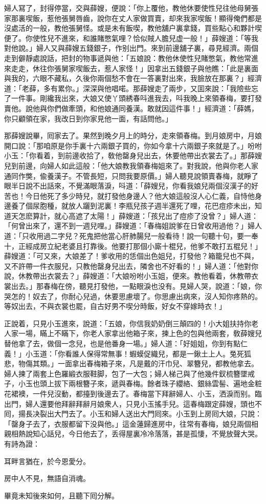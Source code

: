 婦人冩了，封得停當，交與薛嫂，便說：「你上覆他，教他休要使性兒往他母舅張家那裏喫飯，惹他張舅唇齒，說你在丈人家做買賣，却來我家喫飯！顯得俺們都是沒處活的一般，教他張舅怪。或是未有飯喫，教他舖户裏拿錢，買些點心和夥計喫便了。你使性兒不進來，和誰賭憋氣哩？恰似賊人膽兒虚一般！」薛嫂道：「等我對他說。」婦人又與薛嫂五錢銀子，作别出門。來到前邊舖子裏，尋見經濟。兩個走到僻靜處說話，把封的物事遞與他：「五娘說：教他休使性兒賭憋氣，教他常進來走走，休往你張舅家喫飯去，惹人家怪！」因拿出五錢銀子與他瞧：「此是裏面與我的，六眼不藏私，久後你兩個愁不會在一答裏對出來，我臉放在那裏？」經濟道：「老薛，多有累你。」深深與他唱喏。那薛嫂走了兩步，又囬來說：「我險些忘了一件事。剛纔我出來，大娘又使丫頭綉春呌進我去，呌我晚上來領春梅，要打發賣他。說他與你們做牽頭，和他娘通同養漢。敢就因這件事！」經濟道：「薛媽，你只顧領在家，我改日到你家見他一面，有話問他。」

那薛嫂說畢，囘家去了。果然到晚夕月上的時分，走來領春梅。到月娘房中，月娘開口說：「那咱原是你手裏十六兩銀子買的，你如今拿十六兩銀子來就是了。」吩咐小玉：「你看着，到前邊收拾了，敎他罄身兒出去，休要他帶出衣裳去了。」那薛嫂兒到前邊，向婦人如此這般：「他大娘教我領春梅姐來了。對我說，他與你老人家通同作獘，偸養漢子。不管長短，只問我要原價。」婦人聽見說領賣春梅，就睜了眼半日說不出話來，不覺滿眼落淚，呌道：「薛嫂兒，你看我娘兒兩個沒漢子的好苦也！今日他死了多少時兒，就打發他身邊人？他大娘這般沒人心仁義，自恃他身邊養了個尿胞種，就放人躧到泥裏！李瓶兒孩子週半還死了哩，花巴痘疹未出，知道天怎麽算計，就心高遮了太陽！」薛嫂道：「孩兒出了痘疹了没曾？」婦人道：「何曾出來了，還不到一週兒哩。」薛嫂道：「春梅姐說爹在日曾收用過他？」婦人道：「只收用過二字兒？死鬼把他當心肝肺腸兒一般看待！說一句聽十句，要一奉十，正經成房立紀老婆且打靠後。他要打那個小廝十棍兒，他爹不敢打五棍兒！」薛嫂道：「可又來，大娘差了！爹收用的恁個出色姐兒，打發他？箱籠兒也不與，又不許帶一件衣服兒，只教他罄身兒出去，隣舍也不好看的！」婦人道：「他對你說，休教帶出衣裳去？」薛嫂道：「大娘吩咐小玉姐，便來。教他看着，休教帶衣裳出去。」那春梅在傍，聽見打發他，一點眼淚也没有。見婦人哭，說道：「娘，你哭怎的！奴去了，你耐心兒過，休要思慮壞了。你思慮出病來，沒人知你疼熱的。等奴出去，不與衣裳也罷，自古好男不喫分時飯，好女不穿嫁時衣！」

正說着，只見小玉進來，說道：「五娘，你信我奶奶倒三顛四的！小大姐扶持你老人家一場，瞞上不瞞下，你老人家拿出他箱子來，揀上色的包與他兩套，敎薛嫂兒替他拿了去，做個一念兒，也是他番身一場。」婦人道：「好姐姐，你到有點仁義！」小玉道：「你看誰人保得常無事！蝦蟆促織兒，都是一鍬土上人。兔死狐悲，物傷其類。」一面拿出春梅箱子來，凡是戴的汗巾兒、翠簪兒，都教他拿去。婦人揀了兩套上色羅緞衣服鞋脚，包了一大包；婦人梯己與了他幾件釵梳簪墜戒子，小玉也頭上拔下兩根簪子來，遞與春梅。餘者珠子纓絡、銀絲雲髻、遍地金粧花裙襖，一件兒沒動，都擡到後邊去了。春梅當下拜辭婦人、小玉，洒淚而别。臨出門，婦人還要他拜辭拜辭月娘衆人，只見小玉搖手兒。這春梅跟定薛嫂，頭也不囘，揚長决裂出大門去了。小玉和婦人送出大門囘來。小玉到上房囘大娘，只說：「罄身子去了，衣服都留下没與他。」這金蓮歸進房中，往常有春梅，娘兒兩個相親相熱說知心話兒，今日他去了，丢得屋裏冷冷落落，甚是孤悽，不覺放聲大哭。有詩為證：

\begin{myquote}
耳畔言猶在，於今恩愛分。

房中人不見，無語自消魂。
\end{myquote}

畢竟未知後來如何，且聽下囘分解。

